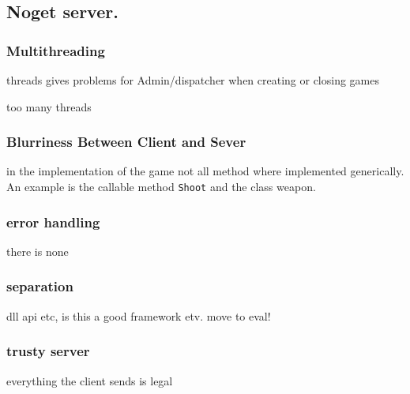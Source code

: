 \subsection{Noget server.}

\subsubsection{Multithreading}
threads gives problems for Admin/dispatcher when creating or closing games

too many threads


\subsubsection{Blurriness Between Client and Sever}
in the implementation of the game not all method where implemented generically. An example is the callable method \texttt{Shoot} and the class weapon. 

\subsubsection{error handling}
there is none

\subsubsection{separation}
dll api etc, is this a good framework
etv. move to eval!

\subsubsection{trusty server}
everything the client sends is legal
